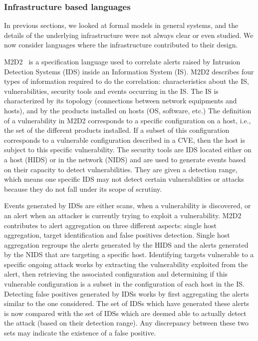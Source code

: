 \subsubsection{Infrastructure based languages}
In previous sections, we looked at formal models in general systems, and the details of the underlying infrastructure were not always clear or even studied. We now consider languages where the infrastructure contributed to their design.

M2D2~\cite{M2D2-Morin2002} is a specification language used to correlate alerts raised by Intrusion Detection Systems (IDS) inside an Information System (IS).
M2D2 describes four types of information required to do the correlation: characteristics about the IS, vulnerabilities, security tools and events occurring in the IS.
The IS is characterized by its topology (connections between network equipments and hosts), and by the products installed on hosts (\eg OS, software,  etc.)
The definition of a vulnerability in M2D2 corresponds to a specific configuration on a host, i.e., the set of the different products installed.
If a subset of this configuration corresponds to a vulnerable configuration described in a CVE, then the host is subject to this specific vulnerability.
The security tools are IDS located either on a host (HIDS) or in the network (NIDS) and are used to generate events based on their capacity to detect vulnerabilities.
They are given a detection range, which means one specific IDS may not detect certain vulnerabilities or attacks because they do not fall under its scope of scrutiny. 

Events generated by IDSs are either scans, when a vulnerability is discovered, or an alert when an attacker is currently trying to exploit a vulnerability.
M2D2 contributes to alert aggregation on three different aspects: single host aggregation, target identification and false positives detection.
Single host aggregation regroups the alerts generated by the HIDS and the alerts generated by the NIDS that are targeting a specific host.
Identifying targets vulnerable to a specific ongoing attack works by extracting the vulnerability exploited from the alert, then retrieving the associated configuration and determining if this vulnerable configuration is a subset in the configuration of each host in the IS.
Detecting false positives generated by IDSs works by first aggregating the alerts similar to the one considered.
The set of IDSs which have generated these alerts is now compared with the set of IDSs which are deemed able to actually detect the attack (based on their detection range).
Any discrepancy between these two sets may indicate the existence of a false positive.

